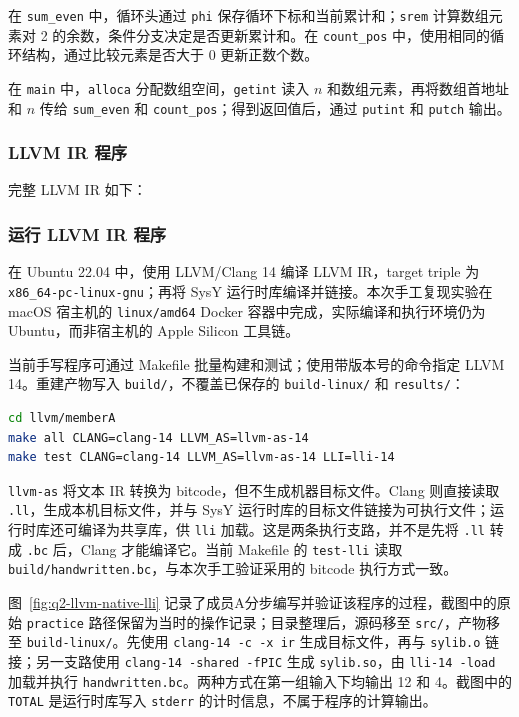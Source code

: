 在 \texttt{sum\_even} 中，循环头通过 \texttt{phi} 保存循环下标和当前累计和；\texttt{srem} 计算数组元素对 2 的余数，条件分支决定是否更新累计和。在 \texttt{count\_pos} 中，使用相同的循环结构，通过比较元素是否大于 0 更新正数个数。

在 \texttt{main} 中，\texttt{alloca} 分配数组空间，\texttt{getint} 读入 $n$ 和数组元素，再将数组首地址和 $n$ 传给 \texttt{sum\_even} 和 \texttt{count\_pos}；得到返回值后，通过 \texttt{putint} 和 \texttt{putch} 输出。

\subsubsection{LLVM IR 程序}

完整 LLVM IR 如下：



\subsubsection{运行 LLVM IR 程序}

在 Ubuntu 22.04 中，使用 LLVM/Clang 14 编译 LLVM IR，target triple 为 \texttt{x86\_64-pc-linux-gnu}；再将 SysY 运行时库编译并链接。本次手工复现实验在 macOS 宿主机的 \texttt{linux/amd64} Docker 容器中完成，实际编译和执行环境仍为 Ubuntu，而非宿主机的 Apple Silicon 工具链。

当前手写程序可通过 Makefile 批量构建和测试；使用带版本号的命令指定 LLVM 14。重建产物写入 \texttt{build/}，不覆盖已保存的 \texttt{build-linux/} 和 \texttt{results/}：

\begin{lstlisting}[language=bash]
cd llvm/memberA
make all CLANG=clang-14 LLVM_AS=llvm-as-14
make test CLANG=clang-14 LLVM_AS=llvm-as-14 LLI=lli-14
\end{lstlisting}

\texttt{llvm-as} 将文本 IR 转换为 bitcode，但不生成机器目标文件。Clang 则直接读取 \texttt{.ll}，生成本机目标文件，并与 SysY 运行时库的目标文件链接为可执行文件；运行时库还可编译为共享库，供 \texttt{lli} 加载。这是两条执行支路，并不是先将 \texttt{.ll} 转成 \texttt{.bc} 后，Clang 才能编译它。当前 Makefile 的 \texttt{test-lli} 读取 \texttt{build/handwritten.bc}，与本次手工验证采用的 bitcode 执行方式一致。

图~\ref{fig:q2-llvm-native-lli} 记录了成员A分步编写并验证该程序的过程，截图中的原始 \texttt{practice} 路径保留为当时的操作记录；目录整理后，源码移至 \texttt{src/}，产物移至 \texttt{build-linux/}。先使用 \texttt{clang-14 -c -x ir} 生成目标文件，再与 \texttt{sylib.o} 链接；另一支路使用 \texttt{clang-14 -shared -fPIC} 生成 \texttt{sylib.so}，由 \texttt{lli-14 -load} 加载并执行 \texttt{handwritten.bc}。两种方式在第一组输入下均输出 12 和 4。截图中的 \texttt{TOTAL} 是运行时库写入 \texttt{stderr} 的计时信息，不属于程序的计算输出。

